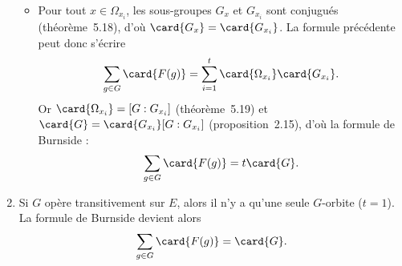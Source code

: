 \begin{enumerate}
\begin{itemize}
      \item
        Pour tout $x\in\Omega_{x_i}$, les sous-groupes $G_x$ et $G_{x_i}$ sont conjugués (théorème~5.18), d'où $\card{G_x} = \card{G_{x_i}}$.
        La formule précédente peut donc s'écrire
        \[
          \sum_{g\in G} \card{F(g)} = \sum_{i = 1}^t \card{\Omega_{x_i}} \card{G_{x_i}}.
        \]
        Or $\card{\Omega_{x_i}} = [G:G_{x_i}]$ (théorème~5.19) et $\card{G} = \card{G_{x_i}} [G:G_{x_i}]$ (proposition~2.15), d'où la formule de Burnside :
        \[
          \sum_{g\in G} \card{F(g)} = t \card{G}.
        \]
    \end{itemize}

  \item
    Si $G$ opère transitivement sur $E$, alors il n'y a qu'une seule $G$-orbite ($t = 1$).
    La formule de Burnside devient alors
    \[
      \sum_{g\in G} \card{F(g)} = \card{G}.
    \]
\end{enumerate}
